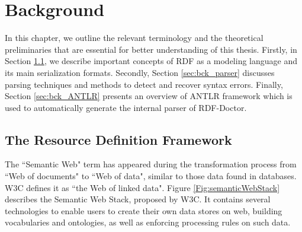 \chapter{Background}
\label{ch:preliminaries}

In this chapter, we outline the relevant terminology and the theoretical preliminaries that are essential for better understanding of this thesis.
Firstly, in Section \ref{sec:bck_rdf_model}, we describe important concepts of RDF as a modeling language and its main serialization formats. 
Secondly, Section \ref{sec:bck_parser} discusses parsing techniques and methods to detect and recover syntax errors. Finally, Section \ref{sec:bck_ANTLR} presents an overview of ANTLR framework which is used to automatically generate the internal parser of RDF-Doctor.

\section{The Resource Definition Framework}
\label{sec:bck_rdf_model}

The ``Semantic Web" \cite{W3C:SemanticWebTerm:Online} term  has appeared during the transformation process from ``Web of documents" to ``Web of data", similar to those data found in databases. 
W3C defines it as ``the Web of linked data". 
{Figure \ref{Fig:semanticWebStack}} describes the Semantic Web Stack, proposed by W3C. 
It contains several technologies to enable users to create their own data stores on web, building vocabularies and ontologies, as well as enforcing processing rules on such data.   

